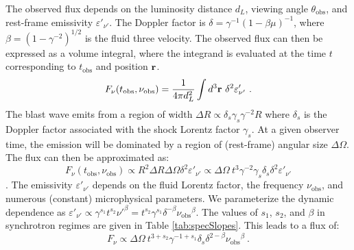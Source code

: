 \documentclass[modern]{aastex62}
\newcommand{\tobs}{\ensuremath{t_{\mathrm{obs}}}}
\newcommand{\nuobs}{\ensuremath{\nu_{\mathrm{obs}}}}
\newcommand{\thobs}{\ensuremath{\theta_{\mathrm{obs}}}}
\begin{document}
The observed flux depends on the luminosity distance $d_L$, viewing angle $\thobs$, and rest-frame emissivity $\varepsilon'_{\nu'}$.  The Doppler factor is $\delta = \gamma^{-1} (1-\beta\mu)^{-1}$, where $\beta=(1-\gamma^{-2})^{1/2}$ is the fluid three velocity.  The observed flux can then be expressed as a volume integral, where the integrand is evaluated at the time $t$ corresponding to $\tobs$ and position ${\bf r}$.
\begin{equation}
	F_\nu(\tobs, \nuobs) = \frac{1}{4\pi d_L^2} \int d^3{\bf r} \ \delta^2 \varepsilon'_{\nu'}\ .
\end{equation}  
The blast wave emits from a region of width $\Delta R \propto \delta_s \gamma_s \gamma^{-2} R $ where $\delta_s$ is the Doppler factor associated with the shock Lorentz factor $\gamma_s$. At a given observer time, the emission will be dominated by a region of (rest-frame) angular size $\Delta \Omega$.  The flux can then be approximated as:
\begin{equation}
	F_\nu(\tobs, \nuobs) \propto R^2 \Delta R \Delta \Omega \delta^2 \varepsilon'_{\nu'} \propto \Delta \Omega\ t^3 \gamma^{-2} \gamma_s \delta_s \delta^2 \varepsilon'_{\nu'}
\end{equation}.
The emissivity $\varepsilon'_{\nu'}$ depends on the fluid Lorentz factor, the frequency $\nuobs$, and numerous (constant) microphysical parameters.  We parameterize the dynamic dependence as $\varepsilon'_{\nu'} \propto \gamma^{s_1} t^{s_2} {\nu'}^\beta = t^{s_2} \gamma^{s_1}\delta^{-\beta} \nuobs^\beta$. The values of $s_1$, $s_2$, and $\beta$ in synchrotron regimes are given in Table \ref{tab:specSlopes}.  This leads to a flux of:
\begin{equation}
	F_\nu \propto \Delta \Omega\ t^{3+s_2} \gamma^{-1+s_1} \delta_s \delta^{2-\beta} \nuobs^\beta\ . \label{eq:fluxApprox}
\end{equation}
\end{document}
